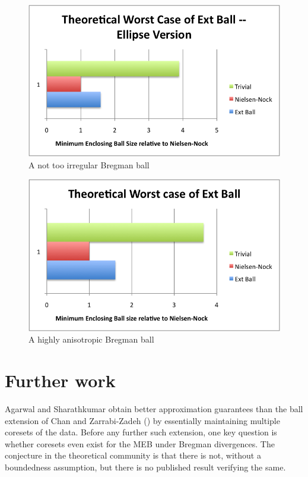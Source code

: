 \documentclass[11pt]{myclass}
\begin{document}
\begin{figure}[H]
  \begin{center}
    \includegraphics[scale = 0.8]{../figures/eb_worst.png}
  \end{center}
  \caption{A not too irregular Bregman ball}
  \label{ball}
\end{figure}
\begin{figure}[H]
  \begin{center}
    \includegraphics[scale = 0.8]{../figures/eb_worst_ellipse.png}
  \end{center}
  \caption{A highly anisotropic Bregman ball}
  \label{ellipse}
\end{figure}

\section{Further work}
Agarwal and Sharathkumar obtain better approximation guarantees than the ball extension of Chan and Zarrabi-Zadeh (\cite{onepointfive}) by essentially maintaining multiple coresets of the data. Before any further such extension, one key question is whether coresets even exist for the MEB under Bregman divergences. The conjecture in the theoretical community is that there is not, without a boundedness assumption, but there is no published result verifying the same.
\end{document}
